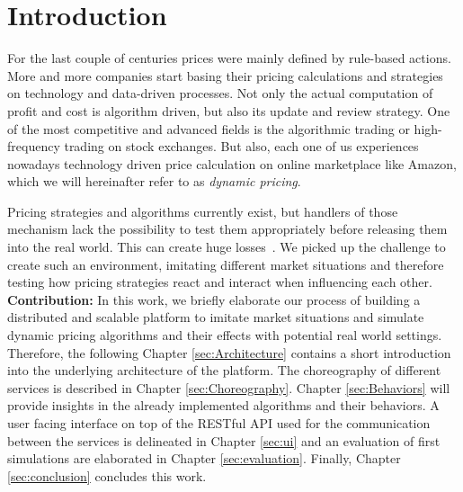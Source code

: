 %
\section{Introduction}
\label{sec:Introduction}
%
For the last couple of centuries prices were mainly defined by rule-based actions. More and more companies start basing their pricing calculations and strategies on technology and data-driven processes. Not only the actual computation of profit and cost is algorithm driven, but also its update and review strategy.
One of the most competitive and advanced fields is the algorithmic trading or high-frequency trading on stock exchanges. But also, each one of us experiences nowadays technology driven price calculation on online marketplace like Amazon, which we will hereinafter refer to as \emph{dynamic pricing}. 

Pricing strategies and algorithms currently exist, but handlers of those mechanism lack the possibility to test them appropriately before releasing them into the real world. This can create huge losses~\citep{uflacker2016ertragsmanagement,schlosser2016optimal,schlosser2016stochastic,schlosser2016survive}. We picked up the challenge to create such an environment, imitating different market situations and therefore testing how pricing strategies react and interact when influencing each other.\\

\textbf{Contribution:} In this work, we briefly elaborate our process of building a distributed and scalable platform to imitate market situations and simulate dynamic pricing algorithms and their effects with potential real world settings.
Therefore, the following Chapter \ref{sec:Architecture} contains a short introduction into the underlying architecture of the platform.
The choreography of different services is described in Chapter \ref{sec:Choreography}. Chapter \ref{sec:Behaviors} will provide insights in the already implemented algorithms and their behaviors.
A user facing interface on top of the RESTful API used for the communication between the services is delineated in Chapter \ref{sec:ui} and an evaluation of first simulations are elaborated in Chapter \ref{sec:evaluation}. Finally, Chapter \ref{sec:conclusion} concludes this work. \\

%
%


